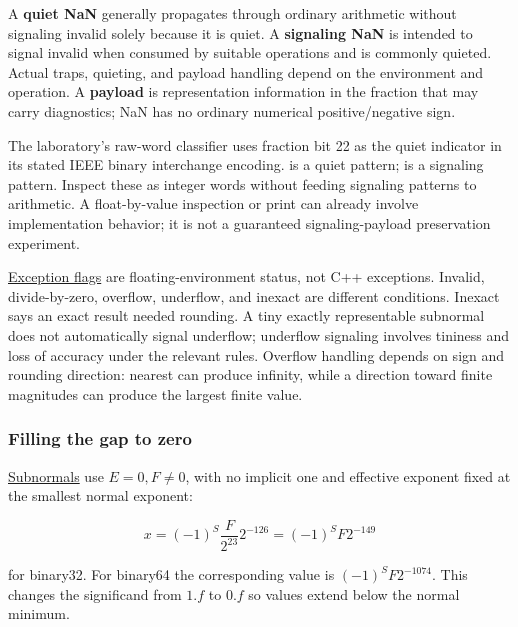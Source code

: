 A \textbf{quiet NaN} generally propagates through ordinary arithmetic without signaling invalid solely because it is quiet. A \textbf{signaling NaN} is intended to signal invalid when consumed by suitable operations and is commonly quieted. Actual traps, quieting, and payload handling depend on the environment and operation. A \textbf{payload} is representation information in the fraction that may carry diagnostics; NaN has no ordinary numerical positive/negative sign.

The laboratory's raw-word classifier uses fraction bit 22 as the quiet indicator in its stated IEEE binary interchange encoding.  is a quiet pattern;  is a signaling pattern. Inspect these as integer words without feeding signaling patterns to arithmetic. A float-by-value inspection or print can already involve implementation behavior; it is not a guaranteed signaling-payload preservation experiment.

\hyperref[appendix-ed8531b46754]{Exception flags} are floating-environment status, not C++  exceptions. Invalid, divide-by-zero, overflow, underflow, and inexact are different conditions. Inexact says an exact result needed rounding. A tiny exactly representable subnormal does not automatically signal underflow; underflow signaling involves tininess and loss of accuracy under the relevant rules. Overflow handling depends on sign and rounding direction: nearest can produce infinity, while a direction toward finite magnitudes can produce the largest finite value.

\subsubsection{Filling the gap to zero}\label{01-foundations-i-ch001-filling-the-gap-to-zero}

\hypertarget{01-foundations-i-ch001-filling-the-gap-to-zero}{}

\hyperref[appendix-00a6e044c437]{Subnormals} use \(E=0,F\ne0\), with no implicit one and effective exponent fixed at the smallest normal exponent:

\[
x=(-1)^S\frac{F}{2^{23}}2^{-126}=(-1)^S F2^{-149}
\]

for binary32. For binary64 the corresponding value is \((-1)^S F2^{-1074}\). This changes the significand from \(1.f\) to \(0.f\) so values extend below the normal minimum.

